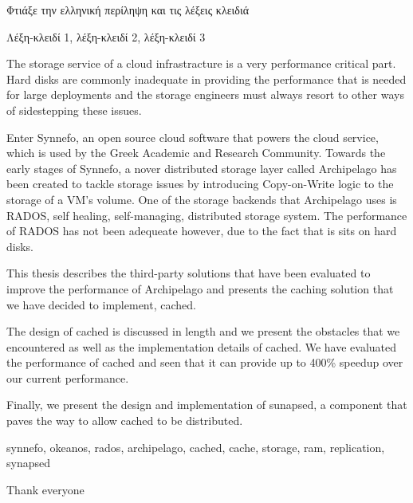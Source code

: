 \begin{abstractgr}
	\todo Φτιάξε την ελληνική περίληψη και τις λέξεις κλειδιά
\begin{keywordsgr}
  	Λέξη-κλειδί 1, λέξη-κλειδί 2, λέξη-κλειδί 3
\end{keywordsgr}
\end{abstractgr}

\begin{abstracten}
	The storage service of a cloud infrastracture is a very performance 
	critical part. Hard disks are commonly inadequate in providing the 
	performance that is needed for large deployments and the storage 
	engineers must always resort to other ways of sidestepping these 
	issues.
	
	Enter Synnefo, an open source cloud software that powers the \okeanos 
	cloud service, which is used by the Greek Academic and Research 
	Community. Towards the early stages of Synnefo, a nover distributed 
	storage layer called Archipelago has been created to tackle storage 
	issues by introducing Copy-on-Write logic to the storage of a VM's 
	volume. One of the storage backends that Archipelago uses is RADOS, 
	self healing, self-managing, distributed storage system. The 
	performance of RADOS has not been adequeate however, due to the fact 
	that is sits on hard disks.

	This thesis describes the third-party solutions that have been 
	evaluated to improve the performance of Archipelago and presents the 
	caching solution that we have decided to implement, cached.
	
	The design of cached is discussed in length and we present the 
	obstacles that we encountered as well as the implementation details of 
	cached. We have evaluated the performance of cached and seen that it 
	can provide up to 400\% speedup over our current performance.

	Finally, we present the design and implementation of sunapsed, a 
	component that paves the way to allow cached to be distributed.

	\begin{keywordsen}
		synnefo, okeanos, rados, archipelago, cached, cache, storage, 
		ram, replication, synapsed
	\end{keywordsen}
\end{abstracten}

\begin{acknowledgementsgr}
	\todo Thank everyone
\end{acknowledgementsgr}



